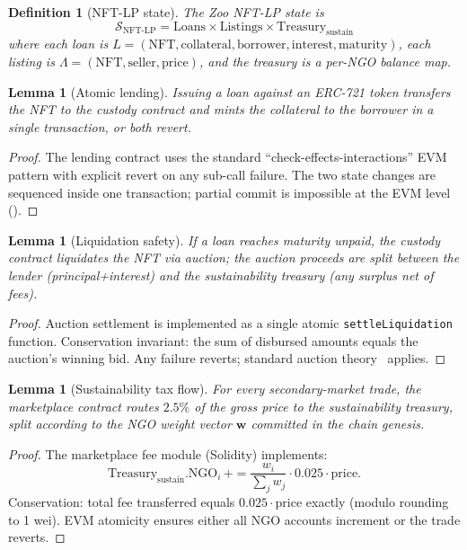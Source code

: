 \documentclass[11pt]{article}
\newtheorem{lemma}[theorem]{Lemma}
\newtheorem{definition}{Definition}
\begin{document}
\begin{definition}[NFT-LP state]
\label{def:state}
The Zoo NFT-LP state is
\[
  \mathcal{S}_{\mathrm{NFT\text{-}LP}} =
  \mathrm{Loans} \times \mathrm{Listings} \times
  \mathrm{Treasury}_{\mathrm{sustain}}
\]
where each loan is
$L = (\mathrm{NFT}, \mathrm{collateral}, \mathrm{borrower},
       \mathrm{interest}, \mathrm{maturity})$,
each listing is
$\Lambda = (\mathrm{NFT}, \mathrm{seller}, \mathrm{price})$,
and the treasury is a per-NGO balance map.
\end{definition}

\begin{lemma}[Atomic lending]
\label{lem:lend}
Issuing a loan against an ERC-721 token transfers the NFT to the
custody contract \emph{and} mints the collateral to the borrower
in a single transaction, or both revert.
\end{lemma}

\begin{proof}
The lending contract uses the standard ``check-effects-interactions''
EVM pattern with explicit revert on any sub-call failure. The two
state changes are sequenced inside one transaction; partial commit
is impossible at the EVM level (\cite{evm-yellow}).
\end{proof}

\begin{lemma}[Liquidation safety]
\label{lem:liq}
If a loan reaches maturity unpaid, the custody contract liquidates
the NFT via auction; the auction proceeds are split between the
lender (principal+interest) and the sustainability treasury
(any surplus net of fees).
\end{lemma}

\begin{proof}
Auction settlement is implemented as a single atomic
\texttt{settleLiquidation} function. Conservation invariant: the
sum of disbursed amounts equals the auction's winning bid. Any
failure reverts; standard auction theory~\cite{vickrey} applies.
\end{proof}

\begin{lemma}[Sustainability tax flow]
\label{lem:tax}
For every secondary-market trade, the marketplace contract routes
$2.5\%$ of the gross price to the sustainability treasury, split
according to the NGO weight vector $\mathbf{w}$ committed in the
chain genesis.
\end{lemma}

\begin{proof}
The marketplace fee module (Solidity) implements:
\[
  \mathrm{Treasury}_{\mathrm{sustain}}.\mathrm{NGO}_i \,+=
  \frac{w_i}{\sum_j w_j} \cdot 0.025 \cdot \mathrm{price}.
\]
Conservation: total fee transferred equals
$0.025 \cdot \mathrm{price}$ exactly (modulo rounding to 1 wei).
EVM atomicity ensures either all NGO accounts increment or the
trade reverts.
\end{proof}
\end{document}

